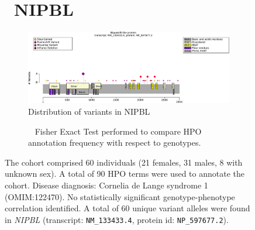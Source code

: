 \begin{figure}[htbp]
    \section*{ NIPBL}
    \centering
    \begin{subfigure}[b]{0.95\textwidth}
    \centering
    \includegraphics[width=\textwidth]{ img/NIPBL_protein_diagram.pdf} 
    \captionsetup{justification=raggedright,singlelinecheck=false}
    \caption{Distribution of variants in NIPBL}
    \end{subfigure}
    
    \vspace{2em}
    
    \begin{subfigure}[b]{0.95\textwidth}
    \centering
    \captionsetup{justification=raggedright,singlelinecheck=false}
    \caption{             Fisher Exact Test performed to compare HPO annotation frequency with respect to genotypes. }
    \end{subfigure}
    
    \vspace{2em}
    
    \caption{ The cohort comprised 60 individuals (21 females, 31 males, 8 with unknown sex). A total of 90 HPO terms were used to annotate the cohort. Disease diagnosis: Cornelia de Lange syndrome 1 (OMIM:122470). No statistically significant genotype-phenotype correlation identified. A total of 60 unique variant alleles were found in \textit{NIPBL} (transcript: \texttt{NM\_133433.4}, protein id: \texttt{NP\_597677.2}).}
    \end{figure}
    